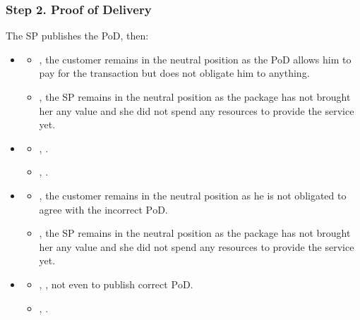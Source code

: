 \subsubsection*{Step 2. \SPTurn{} Proof of Delivery}\label{step-2-proof-of-delivery}

The SP publishes the PoD, then:

\begin{itemize}
  \item \AgreeablePath
    \begin{itemize}
      \item {}, the customer remains in the neutral position as the PoD allows him to pay for the transaction but does not obligate him to anything.
      \item {}, the SP remains in the neutral position as the package has not brought her any value and she did not spend any resources to provide the service yet.
    \end{itemize}

  \item \DisputePath
    \begin{itemize}
      \item {}, \CustomerLosesBeforePayment{}.
      \item {}, .
    \end{itemize}
\end{itemize}

\ActedAbnormallyThen{\sp}

\begin{itemize}
\item \AgreeablePath
  \begin{itemize}
    \item {}, the customer remains in the neutral position as he is not obligated to agree with the incorrect $\mathrm{PoD}$.
    \item {}, the SP remains in the neutral position as the package has not brought her any value and she did not spend any resources to provide the service yet.
  \end{itemize}
\item \DisputePath
  \begin{itemize}
    \item {}, \CustomerLosesBeforePayment{}, not even to publish correct $\mathrm{PoD}$.
    \item {}, .
  \end{itemize}
\end{itemize}

